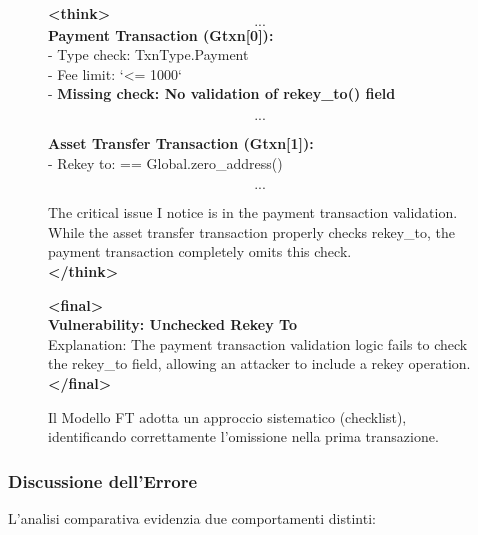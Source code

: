 \newpage

\begin{figure}[h!]
    \centering
    \begin{tcolorbox}[colback=green!5!white, colframe=green!75!black, title=Risposta Modello Fine-Tuned (Qwen3-32B-FT)]
    \small
    \textbf{<think>} \\
     \[...\]
    \textbf{Payment Transaction (Gtxn[0]):} \\
    - Type check: TxnType.Payment \\
    - Fee limit: `<= 1000` \checkmark\\
    - \textbf{Missing check: No validation of rekey\_to() field} 

    \[...\]
    
    \textbf{Asset Transfer Transaction (Gtxn[1]):} \\
    - Rekey to: == Global.zero\_address() \checkmark

     \[...\]
    
    The critical issue I notice is in the payment transaction validation. While the asset transfer transaction properly checks rekey\_to, the payment transaction completely omits this check. \\
    \textbf{</think>}
    
    \textbf{<final>} \\
    \textbf{Vulnerability: Unchecked Rekey To} \\
    Explanation: The payment transaction validation logic fails to check the rekey\_to field, allowing an attacker to include a rekey operation. \\
    \textbf{</final>}
    \end{tcolorbox}
    \caption{Il Modello FT adotta un approccio sistematico (checklist), identificando correttamente l'omissione nella prima transazione.}
    \label{fig:resp_ft}
\end{figure}
\newpage

\subsubsection{Discussione dell'Errore}
L'analisi comparativa evidenzia due comportamenti distinti:


